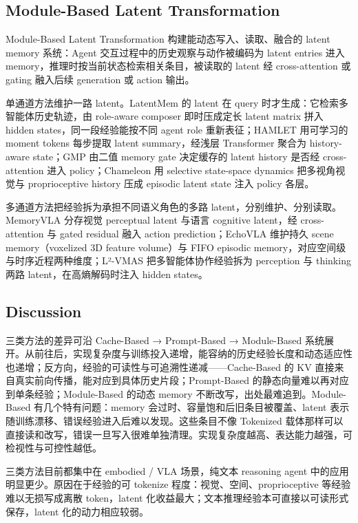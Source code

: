\subsection{Module-Based Latent Transformation}

Module-Based Latent Transformation 构建能动态写入、读取、融合的 latent memory 系统：Agent 交互过程中的历史观察与动作被编码为 latent entries 进入 memory，推理时按当前状态检索相关条目，被读取的 latent 经 cross-attention 或 gating 融入后续 generation 或 action 输出。

单通道方法维护一路 latent。LatentMem \cite{Fu26} 的 latent 在 query 时才生成：它检索多智能体历史轨迹，由 role-aware composer 即时压成定长 latent matrix 拼入 hidden states，同一段经验能按不同 agent role 重新表征；HAMLET \cite{Koo25} 用可学习的 moment tokens 每步提取 latent summary，经浅层 Transformer 聚合为 history-aware state；GMP \cite{Gao26} 由二值 memory gate 决定缓存的 latent history 是否经 cross-attention 进入 policy；Chameleon \cite{Guo26} 用 selective state-space dynamics 把多视角视觉与 proprioceptive history 压成 episodic latent state 注入 policy 各层。

多通道方法把经验拆为承担不同语义角色的多路 latent，分别维护、分别读取。MemoryVLA \cite{Shi25} 分存视觉 perceptual latent 与语言 cognitive latent，经 cross-attention 与 gated residual 融入 action prediction；EchoVLA \cite{Lin25d} 维护持久 scene memory（voxelized 3D feature volume）与 FIFO episodic memory，对应空间级与时序近程两种维度；L²-VMAS \cite{Yu26d} 把多智能体协作经验拆为 perception 与 thinking 两路 latent，在高熵解码时注入 hidden states。




\subsection{Discussion}

三类方法的差异可沿 Cache-Based → Prompt-Based → Module-Based 系统展开。从前往后，实现复杂度与训练投入递增，能容纳的历史经验长度和动态适应性也递增；反方向，经验的可读性与可追溯性递减——Cache-Based 的 KV 直接来自真实前向传播，能对应到具体历史片段；Prompt-Based 的静态向量难以再对应到单条经验；Module-Based 的动态 memory 不断改写，出处最难追到。Module-Based 有几个特有问题：memory 会过时、容量饱和后旧条目被覆盖、latent 表示随训练漂移、错误经验进入后难以发现。这些条目不像 Tokenized 载体那样可以直接读和改写，错误一旦写入很难单独清理。实现复杂度越高、表达能力越强，可检视性与可控性越低。

三类方法目前都集中在 embodied / VLA 场景，纯文本 reasoning agent 中的应用明显更少。原因在于经验的可 tokenize 程度：视觉、空间、proprioceptive 等经验难以无损写成离散 token，latent 化收益最大；文本推理经验本可直接以可读形式保存，latent 化的动力相应较弱。


